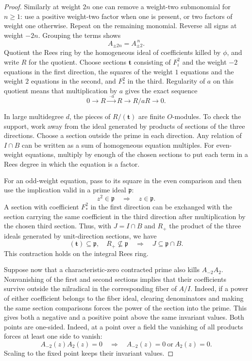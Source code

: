 \begin{proof}
Similarly at weight \(2n\)
one can remove a weight-two submonomial for \(n\ge1\): use a
positive weight-two factor when one is present, or two factors
of weight one otherwise. Repeat on the remaining monomial.
Reverse all signs at weight \(-2n\). Grouping the terms shows
\[
                       A_{\pm2n}=A_{\pm2}^{\,n}.
\] Quotient the Rees ring by the
homogeneous ideal of coefficients killed by \(\phi\), and
write \(R\) for the quotient. Choose sections \(\mathbf t\)
consisting of \(F_i^2\) and the weight \(-2\) equations
in the first direction, the squares of the weight \(1\)
equations and the weight \(2\) equations in the second,
and \(F_*^2\) in the third. Regularity of \(a\) on this quotient means that multiplication by \(a\) gives the exact sequence
\[
 0\longrightarrow R\xrightarrow{\ \cdot a\ }R\longrightarrow R/aR\longrightarrow0 .
\]

In large multidegree \(d\), the pieces of \(R/(\mathbf t)\)
are finite \(O\)-modules. To check the support, work away
from the ideal generated by products of sections of the
three directions. Choose a section outside the prime
in each direction. Any relation of \(I\cap B\) can
be written as a sum of homogeneous equation multiples.
For even-weight equations, multiply by enough of the
chosen sections to put each term in a Rees degree in
which the equation is a factor.

For an odd-weight equation, pass to its square in the even comparison and then use the implication valid in a prime ideal \(\mathfrak p\):
\[
 z^2\in\mathfrak p\quad\Longrightarrow\quad z\in\mathfrak p .
\]
A section with coefficient \(F_*^2\) in the first
direction can be exchanged with the section carrying
the same coefficient in the third direction after
multiplication by the chosen third section. Thus, with \(J=I\cap B\) and \(R_+\) the product of the
three ideals generated by unit-direction sections, we have
\[
 (\mathbf t)\subseteq\mathfrak p,\quad R_+\not\subseteq\mathfrak p
     \quad\Longrightarrow\quad J\subseteq\mathfrak p\cap B .
\]
This contraction holds on the integral Rees ring.

Suppose now that a characteristic-zero contracted prime
also kills \(A_{-2}A_2\). Nonvanishing of the first and second
sections implies that their coefficients survive outside
the nilradical in the corresponding fiber of \(A/I\).
Indeed, if a power of either coefficient belongs to the
fiber ideal, clearing denominators and making the same
section comparisons forces the power of the section
into the prime. This gives both a negative and a positive
point above the same invariant values. Both points are one-sided. Indeed, at a point over a field the vanishing of all products forces at least one side to vanish:
\[
 A_{-2}(z)A_2(z)=0\quad\Longrightarrow\quad A_{-2}(z)=0\ \text{or}\ A_2(z)=0 .
\] Scaling to the fixed point
keeps their invariant values.


\end{proof}
